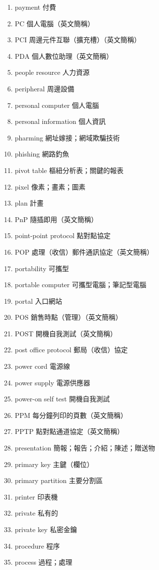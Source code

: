 \begin{enumerate}
  \item payment 付費
  \item PC 個人電腦（英文簡稱）
  \item PCI 周邊元件互聯（擴充槽）（英文簡稱）
  \item PDA 個人數位助理（英文簡稱）
  \item people resource 人力資源
  \item peripheral 周邊設備
  \item personal computer 個人電腦
  \item personal information 個人資訊
  \item pharming 網址嫁接；網域欺騙技術
  \item phishing 網路釣魚
  \item pivot table 樞紐分析表；關鍵的報表
  \item pixel 像素；畫素；圖素
  \item plan 計畫
  \item PnP 隨插即用（英文簡稱）
  \item point-point protocol 點對點協定
  \item POP 處理（收信）郵件通訊協定（英文簡稱）
  \item portability 可攜型
  \item portable computer 可攜型電腦；筆記型電腦
  \item portal 入口網站
  \item POS 銷售時點（管理）（英文簡稱）
  \item POST 開機自我測試（英文簡稱）
  \item post office protocol 郵局（收信）協定
  \item power cord 電源線
  \item power supply 電源供應器
  \item power-on self test 開機自我測試
  \item PPM 每分鐘列印的頁數（英文簡稱）
  \item PPTP 點對點通道協定（英文簡稱）
  \item presentation 簡報；報告；介紹；陳述；贈送物
  \item primary key 主鍵（欄位）
  \item primary partition 主要分割區
  \item printer 印表機
  \item private 私有的
  \item private key 私密金鑰
  \item procedure 程序
  \item process 過程；處理

\end{enumerate}
